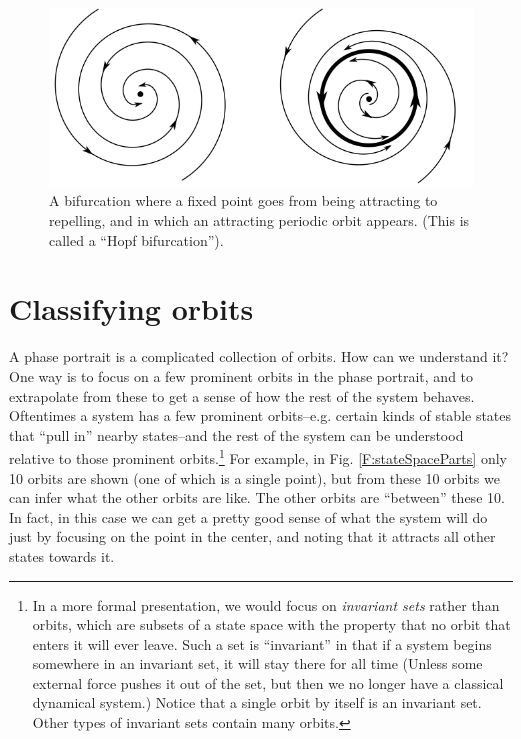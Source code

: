 \begin{figure}[h]
\centering
\includegraphics[scale=.5]{./images/bifurcation.png}
\caption[Scott Hotton.]{A bifurcation where a fixed point goes from being attracting to repelling, and in which an attracting periodic orbit appears. (This is called a ``Hopf bifurcation''). }
\label{F:bifurcation}
\end{figure}

\section{Classifying orbits}


A phase portrait is a complicated collection of orbits. How can we understand it?  One way is to focus on a few prominent orbits in the phase portrait, and to extrapolate from these to get a sense of how the rest of the system behaves. Oftentimes a system has a few prominent orbits--e.g. certain kinds of stable states that ``pull in'' nearby states--and the rest of the system can be understood relative to those prominent orbits.\footnote{In a more formal presentation, we would focus on  \emph{invariant sets} rather than orbits, which are subsets of a state space with the property that no orbit that enters it will ever leave. Such a set is ``invariant'' in that if a system begins somewhere in an invariant set, it will stay there for all time (Unless some external force pushes it out of the set, but then we no longer have a classical dynamical system.) Notice that a single orbit by itself is an invariant set. Other types of invariant sets contain many orbits.}  For example, in Fig. \ref{F:stateSpaceParts} only 10 orbits are shown (one of which is a single point), but from these 10 orbits we can infer what the other orbits are like. The other orbits are ``between'' these 10. In fact, in this case we can get a pretty good sense of what the system will do just by focusing on the point in the center, and noting that it attracts all other states towards it.

